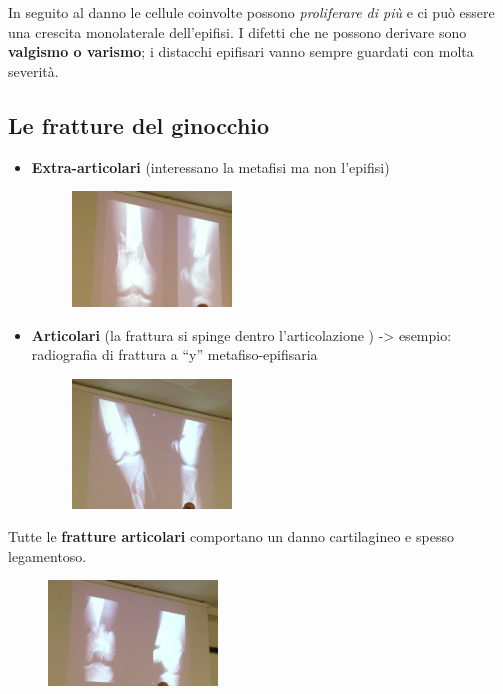 In seguito al danno le cellule coinvolte possono \emph{proliferare di più} e ci può essere una crescita monolaterale dell'epifisi. I difetti che ne possono derivare sono \textbf{valgismo o varismo}; i distacchi
epifisari vanno sempre guardati con molta severità.

\subsection{Le fratture del ginocchio}

\begin{itemize}
\item
  \textbf{Extra-articolari} (interessano la metafisi ma non l'epifisi)
 \begin{figure}[!ht]
\centering
\includegraphics[width=0.4\textwidth]{009/image7.png}
\end{figure}
\item
  \textbf{Articolari} (la frattura si spinge dentro l'articolazione ) ->  esempio: radiografia di frattura a ``y'' metafiso-epifisaria
\begin{figure}[!ht]
\centering
\includegraphics[width=0.4\textwidth]{009/image8.png}
\end{figure}
\end{itemize}
Tutte le \textbf{fratture articolari} comportano un danno cartilagineo e spesso legamentoso.

\begin{figure}[!ht]
\centering
\includegraphics[width=0.4\textwidth]{009/image9.png}
\end{figure}

